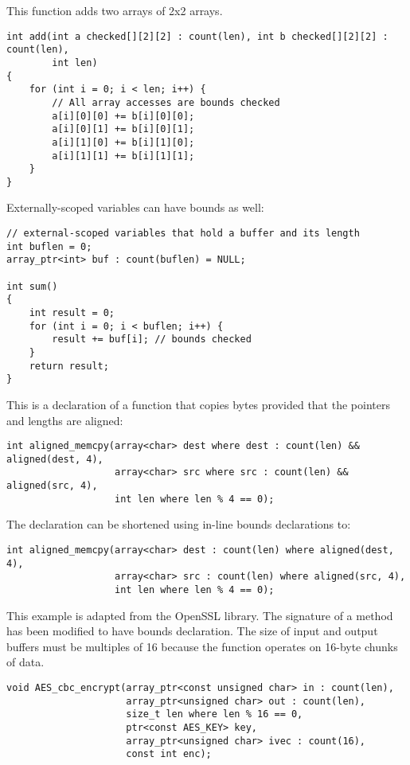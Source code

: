This function adds two arrays of 2x2 arrays.

\begin{verbatim}
int add(int a checked[][2][2] : count(len), int b checked[][2][2] : count(len), 
        int len) 
{
    for (int i = 0; i < len; i++) {
        // All array accesses are bounds checked
        a[i][0][0] += b[i][0][0]; 
        a[i][0][1] += b[i][0][1];
        a[i][1][0] += b[i][1][0];
        a[i][1][1] += b[i][1][1];
    }
}
\end{verbatim}

Externally-scoped variables can have bounds as well:

\begin{verbatim}
// external-scoped variables that hold a buffer and its length
int buflen = 0;
array_ptr<int> buf : count(buflen) = NULL;

int sum()
{
    int result = 0;
    for (int i = 0; i < buflen; i++) {
        result += buf[i]; // bounds checked
    }
    return result;
}
\end{verbatim}

This is a declaration of a function that copies bytes provided that the
pointers and lengths are aligned:
\begin{verbatim}
int aligned_memcpy(array<char> dest where dest : count(len) && aligned(dest, 4),
                   array<char> src where src : count(len) && aligned(src, 4),
                   int len where len % 4 == 0);
\end{verbatim}

The declaration can be shortened using in-line bounds declarations to:

\begin{verbatim}
int aligned_memcpy(array<char> dest : count(len) where aligned(dest, 4),
                   array<char> src : count(len) where aligned(src, 4),
                   int len where len % 4 == 0);
\end{verbatim}

This example is adapted from the OpenSSL library. The signature of a
method has been modified to have bounds declaration. The size of input
and output buffers must be multiples of 16 because the function operates
on 16-byte chunks of data.

\begin{verbatim}
void AES_cbc_encrypt(array_ptr<const unsigned char> in : count(len),
                     array_ptr<unsigned char> out : count(len),
                     size_t len where len % 16 == 0,
                     ptr<const AES_KEY> key,
                     array_ptr<unsigned char> ivec : count(16),
                     const int enc);
\end{verbatim}

